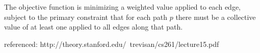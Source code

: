 \documentclass[11pt]{article}
\begin{document}
\begin{enumerate}[(a)]
\begin{solution}
    The objective function is minimizing a weighted value applied to each edge, subject to the primary constraint that for each path $p$ there must be a collective value of at least one applied to all edges along that path.
\end{solution}

\end{enumerate}

referenced: http://theory.stanford.edu/~trevisan/cs261/lecture15.pdf

\clearpage
\end{document}
